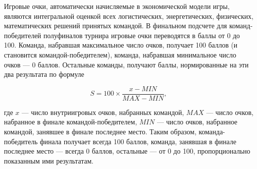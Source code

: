 \markSection

Игровые очки, автоматически начисляемые в экономической модели игры, являются интегральной оценкой всех логистических, энергетических, физических, математических решений принятых командой. В финальном подсчете для команд-победителей полуфиналов турнира игровые очки переводятся в баллы от 0 до 100. Команда, набравшая максимальное число очков, получает 100 баллов (и становится командой-победителем), команда, набравшая минимальное число очков — 0 баллов. Остальные команды, получают баллы, нормированные на эти два результата по формуле 

$$S = 100\times \frac{x - MIN}{MAX - MIN},$$

где $x$ — число внутриигровых очков, набранных командой, $MAX$ — число очков, набранное в финале командой-победителем, $MIN$ — число очков, набранное командой, занявшее в финале последнее место. Таким образом, команда-победитель финала получает всегда 100 баллов, команда, занявшая в финале последнее место — всегда 0 баллов, остальные — от 0 до 100, пропорционально показанным ими результатам.